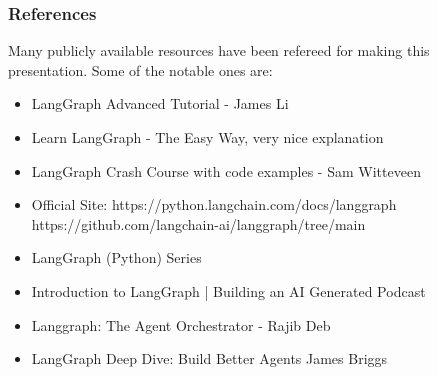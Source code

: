 \begin{frame}\frametitle{References}
Many publicly available resources have been refereed for making this presentation. Some of the notable ones are:
\footnotesize
\begin{itemize}
\item LangGraph Advanced Tutorial  - James Li
\item Learn LangGraph - The Easy Way, very nice explanation
\item LangGraph Crash Course with code examples - Sam Witteveen 
\item Official Site: https://python.langchain.com/docs/langgraph https://github.com/langchain-ai/langgraph/tree/main
\item LangGraph (Python) Series
\item Introduction to LangGraph | Building an AI Generated Podcast 
\item Langgraph: The Agent Orchestrator - Rajib Deb 
\item LangGraph Deep Dive: Build Better Agents James Briggs 
\end{itemize}

\end{frame}